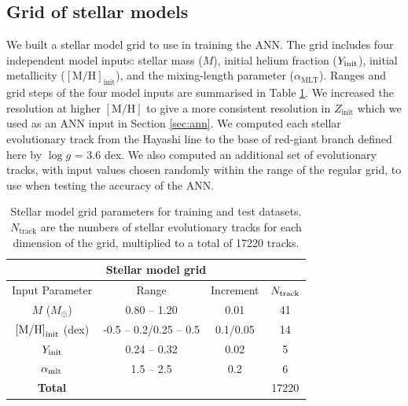 \documentclass[fleqn,usenatbib]{mnras}
\newcommand{\metallicity}{\ensuremath{[\mathrm{M}/\mathrm{H}]}}
\newcommand{\mlt}{\ensuremath{{\alpha_\mathrm{MLT}}}}
\begin{document}
\subsection{Grid of stellar models}\label{sec:grid}



We built a stellar model grid to use in training the ANN. The grid includes four independent model inputs: stellar mass ($M$), initial helium fraction ($Y_{\rm init}$), initial metallicity ($\mathrm{[M/H]}_\mathrm{init}$), and the mixing-length parameter ($\mlt$). Ranges and grid steps of the four model inputs are summarised in Table \ref{tab:grid}. We increased the resolution at higher $\metallicity$ to give a more consistent resolution in $Z_\mathrm{init}$ which we used as an ANN input in Section \ref{sec:ann}. We computed each stellar evolutionary track from the Hayashi line to the base of red-giant branch defined here by $\log g$ = 3.6 dex. 
We also computed an additional set of evolutionary tracks, with input values chosen randomly within the range of the regular grid, to use when testing the accuracy of the ANN.

\begin{table}
	\centering
	\caption{Stellar model grid parameters for training and test datasets. $N_\mathrm{track}$ are the numbers of stellar evolutionary tracks for each dimension of the grid, multiplied to a total of \num{17220} tracks.}
	\label{tab:grid}
	\begin{tabular}{cccc} %
		\toprule
		\multicolumn{4}{c}{\textbf{Stellar model grid}}\\
		\midrule
		Input Parameter & Range & Increment & $N_{\rm track}$\\
        \midrule
	$M$ ($M_{\odot}$)  & 0.80 -- 1.20 &  0.01& \num{41}\\
        $\rm{[M/H]}_\mathrm{init}$ (dex) & -0.5 -- 0.2/0.25 -- 0.5 & 0.1/0.05 & \num{14}\\
        	$Y_{\rm init}$ & 0.24 -- 0.32 & 0.02 & \num{5}\\
        $\alpha_{\rm{mlt}}$  & 1.5 -- 2.5&  0.2 & \num{6}\\
        \midrule
        \textbf{Total} & & & \num{17220}\\
        \bottomrule
    \end{tabular}
\end{table}
\end{document}
